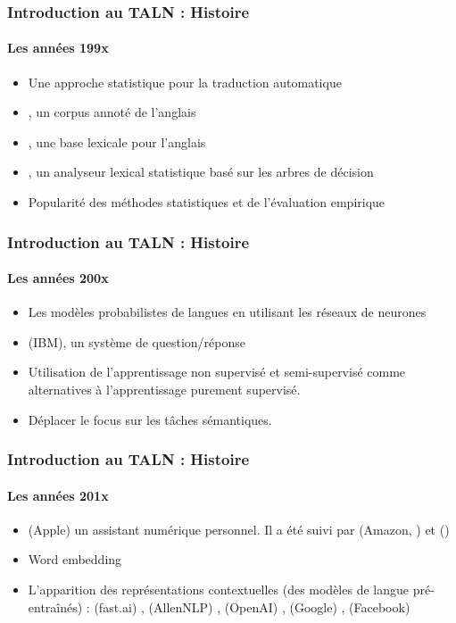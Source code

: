 \documentclass{beamer}
\begin{document}
\begin{frame}
\frametitle{Introduction au TALN : Histoire}
\framesubtitle{Les années 199x}

\begin{itemize}
	\item {} Une approche statistique pour la traduction automatique \cite{1990-brown-al}
	\item {} , un corpus annoté de l'anglais \cite{1993-marcus-al}
	\item {} , une base lexicale pour l'anglais \cite{1995-miller}
	\item {} , un analyseur lexical statistique basé sur les arbres de décision \cite{1996-magerman}
	\item Popularité des méthodes statistiques et de l'évaluation empirique
\end{itemize}

\end{frame}

\begin{frame}
\frametitle{Introduction au TALN : Histoire}
\framesubtitle{Les années 200x}

\begin{itemize}
	\item {} Les modèles probabilistes de langues en utilisant les réseaux de neurones \cite{2003-bengio-al}
	\item {}  (IBM), un système de question/réponse
	\item Utilisation de l'apprentissage non supervisé et semi-supervisé comme alternatives à l'apprentissage purement supervisé.
	\item Déplacer le focus sur les tâches sémantiques.
\end{itemize}

\end{frame}

\begin{frame}
\frametitle{Introduction au TALN : Histoire}
\framesubtitle{Les années 201x}

\begin{itemize}
	\item {}  (Apple)  un assistant numérique personnel. Il a été suivi par  (Amazon, ) et  ()
	\item {} Word embedding \cite{2014-lebret-collobert}
	\item {} L'apparition des représentations contextuelles (des modèles de langue pré-entraînés) :  (fast.ai) \cite{2018-howard-ruder},  (AllenNLP) \cite{2018-peters-al},  (OpenAI) \cite{2018-radford-al},  (Google) \cite{2018-devlin-al},  (Facebook) \cite{2019-lample-conneau}
\end{itemize}

\end{frame}
\end{document}
